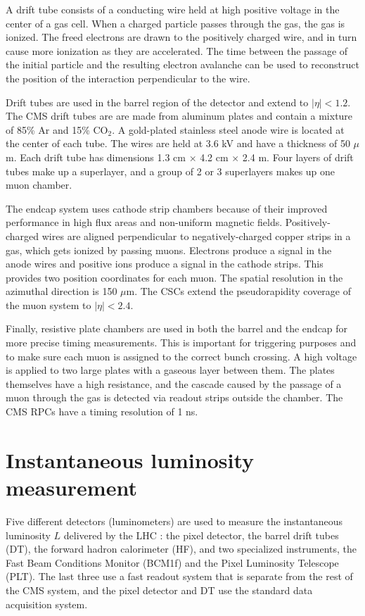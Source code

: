 A drift tube consists of a conducting wire held at high positive voltage in the center of a gas cell. When a charged particle passes through the gas, the gas is ionized. The freed electrons are drawn to the positively charged wire, and in turn cause more ionization as they are accelerated. The time between the passage of the initial particle and the resulting electron avalanche can be used to reconstruct the position of the interaction perpendicular to the wire.

Drift tubes are used in the barrel region of the detector and extend to $|\eta| < 1.2$. The CMS drift tubes are are made from aluminum plates and contain a mixture of 85\% Ar and 15\% CO$_2$. A gold-plated stainless steel anode wire is located at the center of each tube. The wires are held at 3.6 kV and have a thickness of 50 $\mu$m. Each drift tube has dimensions 1.3 cm $\times$ 4.2 cm $\times$ 2.4 m. Four layers of drift tubes make up a superlayer, and a group of 2 or 3 superlayers makes up one muon chamber.

The endcap system uses cathode strip chambers because of their improved performance in high flux areas and non-uniform magnetic fields. Positively-charged wires are aligned perpendicular to negatively-charged copper strips in a gas, which gets ionized by passing muons. Electrons produce a signal in the anode wires and positive ions produce a signal in the cathode strips. This provides two position coordinates for each muon. The spatial resolution in the azimuthal direction is 150 $\mu$m. The CSCs extend the pseudorapidity coverage of the muon system to $|\eta| < 2.4$.

Finally, resistive plate chambers are used in both the barrel and the endcap for more precise timing measurements. This is important for triggering purposes and to make sure each muon is assigned to the correct bunch crossing. A high voltage is applied to two large plates with a gaseous layer between them. The plates themselves have a high resistance, and the cascade caused by the passage of a muon through the gas is detected via readout strips outside the chamber. The CMS RPCs have a timing resolution of 1 ns. 

\section{Instantaneous luminosity measurement}
\label{sec:lumi}

Five different detectors (luminometers) are used to measure the instantaneous luminosity $L$ delivered by the LHC \cite{lumiPAS}: the pixel detector, the barrel drift tubes (DT), the forward hadron calorimeter (HF), and two specialized instruments, the Fast Beam Conditions Monitor (BCM1f) and the Pixel Luminosity Telescope (PLT). The last three use a fast readout system that is separate from the rest of the CMS system, and the pixel detector and DT use the standard data acquisition system. 

